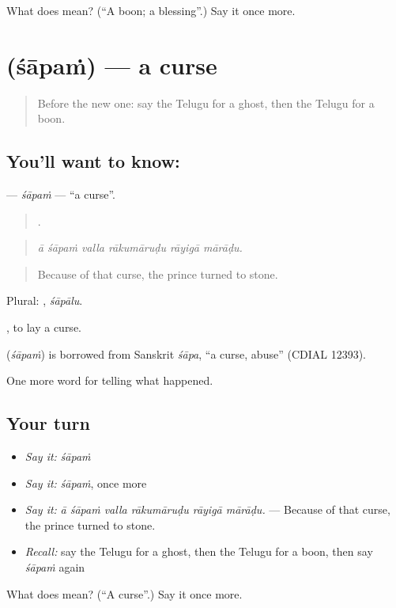 \begin{tcolorbox}[breakable,colback=teal!4,colframe=teal!35!black,title={Before you move on}]
What does  mean? (\textquotedblleft{}A boon; a blessing\textquotedblright{}.) Say it once more.
\end{tcolorbox}
\section[\texorpdfstring{\te{శాపం} (śāpaṁ)}{శాపం (śāpaṁ)}]{ (śāpaṁ) — a curse}

\label{lesson:TE-C371-sapam}



\begin{quote}
Before the new one: say the Telugu for a ghost, then the Telugu for a boon.
\end{quote}

\subsection*{You'll want to know: }
\textbf{} — \emph{śāpaṁ} — \textquotedblleft{}a curse\textquotedblright{}.

\begin{quote}
     .
\end{quote}

\begin{quote}
\emph{ā śāpaṁ valla rākumāruḍu rāyigā mārāḍu.}
\end{quote}

\begin{quote}
Because of that curse, the prince turned to stone.
\end{quote}

Plural: , \emph{śāpālu}.

 , to lay a curse.

\begin{cousinweb}
\textbf{} (\emph{śāpaṁ}) is borrowed from Sanskrit \emph{śāpa}, \textquotedblleft{}a curse, abuse\textquotedblright{} (CDIAL 12393).
\end{cousinweb}

\begin{grammarlens}[title={What you've built}]
One more word for telling what happened.
\end{grammarlens}

\subsection*{Your turn}
\begin{itemize}
\raggedright
  \item \emph{Say it:} \emph{śāpaṁ}
  \item \emph{Say it:} \emph{śāpaṁ}, once more
  \item \emph{Say it:} \emph{ā śāpaṁ valla rākumāruḍu rāyigā mārāḍu.} — Because of that curse, the prince turned to stone.
  \item \emph{Recall:} say the Telugu for a ghost, then the Telugu for a boon, then say \emph{śāpaṁ} again
\end{itemize}

\begin{tcolorbox}[breakable,colback=teal!4,colframe=teal!35!black,title={Before you move on}]
What does  mean? (\textquotedblleft{}A curse\textquotedblright{}.) Say it once more.
\end{tcolorbox}
